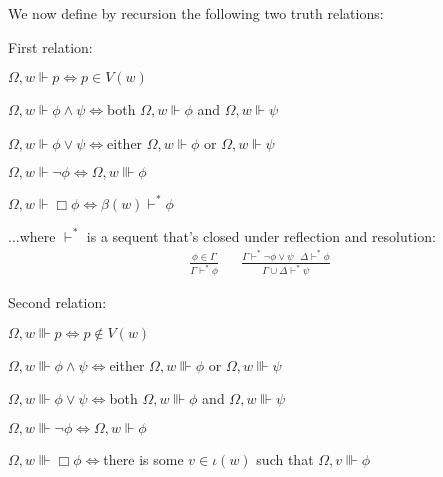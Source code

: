 \begin{definition}
  We now define by recursion the following two truth relations:
  
  First relation:
  \begin{empt}
    \item $\Omega, w \Vdash p \Longleftrightarrow p \in V (w)$
    
    \item $\Omega, w \Vdash \phi \wedge \psi \Longleftrightarrow$both $\Omega,
    w \Vdash \phi$ and $\Omega, w \Vdash \psi$
    
    \item $\Omega, w \Vdash \phi \vee \psi \Longleftrightarrow$either $\Omega,
    w \Vdash \phi$ or $\Omega, w \Vdash \psi$
    
    \item $\Omega, w \Vdash \neg \phi \Longleftrightarrow \Omega, w \Vvdash
    \phi$
    
    \item $\Omega, w \Vdash \Box \phi \Longleftrightarrow \beta (w)
    \vdash^{\ast} \phi$
    
    $\ldots$where $\vdash^{\ast}$ is a sequent that's closed under reflection
    and resolution:
    \begin{eqnarray*}
      \frac{\phi \in \Gamma}{\Gamma \vdash^{\ast} \phi} &  & \frac{\Gamma
      \vdash^{\ast} \neg \phi \vee \psi \ \ \  \Delta \vdash^{\ast}
      \phi}{\Gamma \cup \Delta \vdash^{\ast} \psi}
    \end{eqnarray*}
  \end{empt}
  Second relation:
  \begin{empt}
    \item $\Omega, w \Vvdash p \Longleftrightarrow p \nin V (w)$
    
    \item $\Omega, w \Vvdash \phi \wedge \psi \Longleftrightarrow$either
    $\Omega, w \Vvdash \phi$ or $\Omega, w \Vvdash \psi$
    
    \item $\Omega, w \Vvdash \phi \vee \psi \Longleftrightarrow$both $\Omega,
    w \Vvdash \phi$ and $\Omega, w \Vvdash \psi$
    
    \item $\Omega, w \Vvdash \neg \phi \Longleftrightarrow \Omega, w \Vdash
    \phi$
    
    \item $\Omega, w \Vvdash \Box \phi \Longleftrightarrow$there is some $v
    \in \iota (w)$ such that $\Omega, v \Vvdash \phi$
  \end{empt}
\end{definition}

